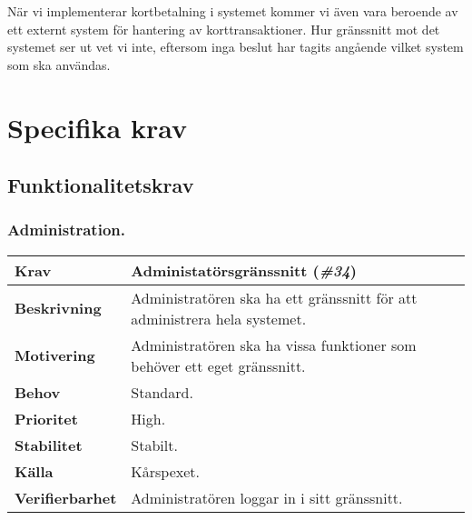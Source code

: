 \documentclass[a4paper, twoside, 11pt, titlepage]{article}
\begin{document}
	När vi implementerar kortbetalning i systemet kommer vi även vara beroende av ett externt system för hantering av korttransaktioner. Hur gränssnitt mot det systemet ser ut vet vi inte, eftersom inga beslut har tagits angående vilket system som ska användas.

\clearpage
\section{Specifika krav}



	\subsection{Funktionalitetskrav}



		\subsubsection{Administration.}


		\begin{tabular} { p{2.6cm} p{12.5cm} }
			\hline
			\sffamily\textbf{Krav} & Administatörsgränssnitt (\emph{\#34})  \\
			\hline
			\sffamily\textbf{Beskrivning} & Administratören ska ha ett gränssnitt för att administrera hela systemet.  \\
			\hline
			\sffamily\textbf{Motivering} & Administratören ska ha vissa funktioner som behöver ett eget gränssnitt.  \\
			\hline
			\sffamily\textbf{Behov} & Standard.  \\
			\hline
			\sffamily\textbf{Prioritet} & High.  \\
			\hline
			\sffamily\textbf{Stabilitet} & Stabilt.  \\
			\hline
			\sffamily\textbf{Källa} & Kårspexet.  \\
			\hline
			\sffamily\textbf{Verifierbarhet} & Administratören loggar in i sitt gränssnitt.  \\
			\hline
		\end{tabular}
		\vspace{6mm}
\end{document}
